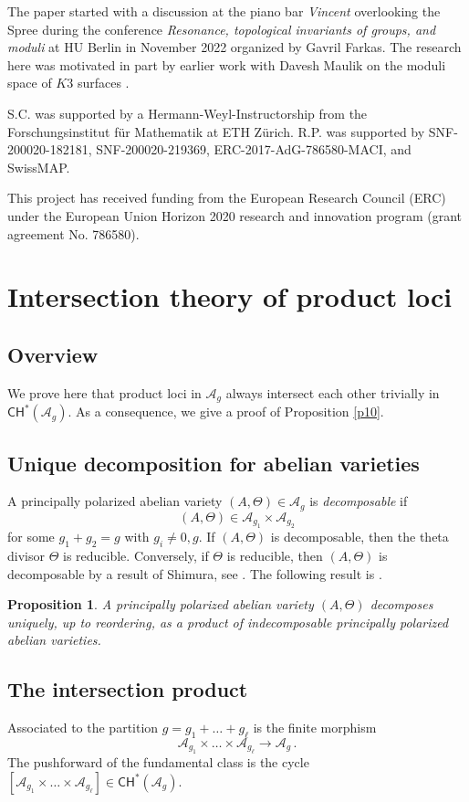 \documentclass[11pt]{amsart}
\newtheorem{prop}[thm]{Proposition}
\theoremstyle{definition}
\newcommand{\A}{\mathcal{A}}
\newcommand{\CH}{\mathsf{CH}}
\begin{document}
{The paper started with a 
discussion at the piano
bar {\em Vincent} overlooking
the Spree during the conference
{\em Resonance, topological invariants of groups, and moduli} at HU Berlin in November 2022 organized by Gavril Farkas. 
The research here was motivated
in part by earlier work with
Davesh Maulik on the moduli space
of $K3$ surfaces \cite{MaulikP}.


S.C. was supported by a Hermann-Weyl-Instructorship from the Forschungsinstitut f\"ur Mathematik at ETH Z\"urich.
R.P. was supported by
SNF-200020-182181,  
SNF-200020-219369,
ERC-2017-AdG-786580-MACI, and SwissMAP. 

This project has
received funding from the European Research Council (ERC) under the European Union Horizon 2020 research and innovation program (grant agreement No. 786580).

\section{Intersection theory of product loci}\label{extended}
 
 \subsection{Overview}
We prove here that product loci in $\A_g$ always intersect each other trivially in $\mathsf{CH}^*(\A_g)$. As a consequence, we give a proof of Proposition \ref{p10}.

\subsection{Unique decomposition 
for abelian varieties}

A principally polarized abelian
variety
$(A,\Theta)\in \A_g$ is {\em decomposable} if 
$$(A,\Theta) \in \A_{g_1}\times \A_{g_2}$$ for some $g_1+g_2=g$ with $g_i\neq 0, g$. If $(A,\Theta)$ is decomposable, then the theta divisor $\Theta$ is reducible. Conversely, if $\Theta$ is reducible, then $(A,\Theta)$ is decomposable by a result of Shimura, see \cite[Lemma 3.20]{CG}. 
The following result is \cite[Corollary 3.23]{CG}. 
\begin{prop}\label{Splittingtheorem}
 A principally polarized abelian variety $(A,\Theta)$ decomposes uniquely, up to reordering, as a product of indecomposable principally polarized abelian varieties.
\end{prop}


\subsection{The intersection product}
Associated to the partition $g=g_1+\ldots+g_\ell$ is  
the finite morphism $$\A_{g_1}\times \ldots\times \A_{g_\ell}\to \A_g\, .$$ The pushforward of the fundamental class is the cycle
$[\A_{g_1}\times \ldots \times \A_{g_\ell}] \in \CH^*(\A_g).$ 


}
\end{document}
